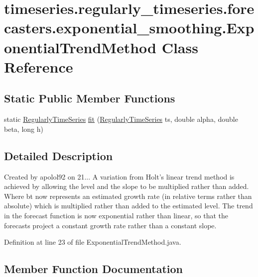 \hypertarget{classtimeseries_1_1regularly__timeseries_1_1forecasters_1_1exponential__smoothing_1_1_exponential_trend_method}{}\section{timeseries.\+regularly\+\_\+timeseries.\+forecasters.\+exponential\+\_\+smoothing.\+Exponential\+Trend\+Method Class Reference}
\label{classtimeseries_1_1regularly__timeseries_1_1forecasters_1_1exponential__smoothing_1_1_exponential_trend_method}
\subsection*{Static Public Member Functions}
\begin{DoxyCompactItemize}
\item 
static \hyperlink{classtimeseries_1_1_regularly_time_series}{Regularly\+Time\+Series} \hyperlink{classtimeseries_1_1regularly__timeseries_1_1forecasters_1_1exponential__smoothing_1_1_exponential_trend_method_a3bf101bc6afc15302d8ed3fe4eaefd18}{fit} (\hyperlink{classtimeseries_1_1_regularly_time_series}{Regularly\+Time\+Series} ts, double alpha, double beta, long h)
\end{DoxyCompactItemize}


\subsection{Detailed Description}
Created by apolol92 on 21... A variation from Holt’s linear trend method is achieved by allowing the level and the slope to be multiplied rather than added. Where bt now represents an estimated growth rate (in relative terms rather than absolute) which is multiplied rather than added to the estimated level. The trend in the forecast function is now exponential rather than linear, so that the forecasts project a constant growth rate rather than a constant slope. 

Definition at line 23 of file Exponential\+Trend\+Method.\+java.



\subsection{Member Function Documentation}
\hypertarget{classtimeseries_1_1regularly__timeseries_1_1forecasters_1_1exponential__smoothing_1_1_exponential_trend_method_a3bf101bc6afc15302d8ed3fe4eaefd18}{}
